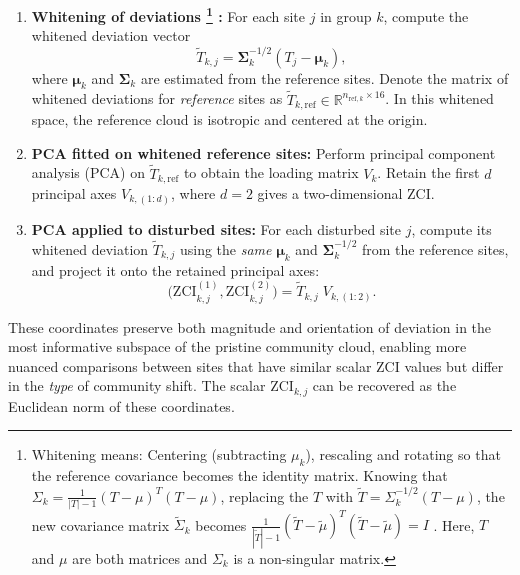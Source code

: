 \begin{enumerate}
    \item \textbf{Whitening of deviations
    \footnote{Whitening means: Centering (subtracting \(\mu_k\)), rescaling and rotating so that the reference
    covariance becomes the identity matrix. Knowing that \(\Sigma_k = \frac{1}{|T|-1} (T - \mu)^T (T - \mu)\),
    replacing the \(T\) with \(\tilde{T} = \Sigma_k^{-1/2} (T - \mu)\),
    the new covariance matrix \(\tilde \Sigma_k\) becomes \(\frac{1}{|\tilde T| - 1} (\tilde{T} - \tilde \mu)^T (\tilde{T} - \tilde \mu) = I \) 
    . Here, \(T\) and \(\mu\) are both matrices and \(\Sigma_k\) is a non-singular matrix.}
    :} For each site $j$ in group $k$, compute the whitened deviation vector
    \[
    \tilde{T}_{k,j} = \boldsymbol{\Sigma}_k^{-1/2} (T_j - \boldsymbol{\mu}_k),
    \]
    where $\boldsymbol{\mu}_k$ and $\boldsymbol{\Sigma}_k$ are estimated from the reference sites.  
    Denote the matrix of whitened deviations for \emph{reference} sites as 
    $\tilde{T}_{k,\mathrm{ref}} \in \mathbb{R}^{n_{\mathrm{ref},k} \times 16}$.  
    In this whitened space, the reference cloud is isotropic and centered at the origin.
    
    \item \textbf{PCA fitted on whitened reference sites:}  
    Perform principal component analysis (PCA) on $\tilde{T}_{k,\mathrm{ref}}$ to obtain the loading matrix $V_k$.  
    Retain the first $d$ principal axes $V_{k,(1:d)}$, where $d=2$ gives a two-dimensional ZCI.

    \item \textbf{PCA applied to disturbed sites:}  
    For each disturbed site $j$, compute its whitened deviation $\tilde{T}_{k,j}$ using the \emph{same} $\boldsymbol{\mu}_k$ and $\boldsymbol{\Sigma}_k^{-1/2}$ from the reference sites, and project it onto the retained principal axes:
    \[
    \big( \mathrm{ZCI}^{(1)}_{k,j}, \mathrm{ZCI}^{(2)}_{k,j} \big)
    = \tilde{T}_{k,j} \; V_{k,(1:2)}.
    \]
\end{enumerate}

These coordinates preserve both magnitude and orientation of deviation in the most informative 
subspace of the pristine community cloud, enabling more nuanced comparisons between sites 
that have similar scalar ZCI values but differ in the \emph{type} of community shift.  
The scalar $\mathrm{ZCI}_{k,j}$ can be recovered as the Euclidean norm of these coordinates.

